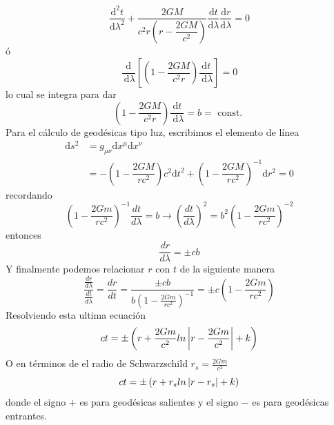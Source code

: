 $$
    \frac{\mathrm{d}^2 t}{\mathrm{d} \lambda^2}+\dfrac{2 G M}{c^2 r\left(r - \dfrac{2 G M}{c^2}\right)} \frac{\mathrm{d} t}{\mathrm{d} \lambda} \frac{\mathrm{d} r}{\mathrm{d} \lambda}=0
$$
ó
$$
    \frac{\mathrm{d}}{\mathrm{~d} \lambda}\left[\left(1-\dfrac{2 G M}{c^2 r}\right) \frac{\mathrm{d} t}{\mathrm{~d} \lambda}\right]=0
$$
lo cual se integra para dar
$$
    \left(1-\dfrac{2 G M}{c^2 r}\right) \frac{\mathrm{d} t}{\mathrm{~d} \lambda}=b=\text { const. }
$$
Para el cálculo de geodésicas tipo luz, escribimos el elemento de línea
\begin{equation}
    \begin{aligned}
        \mathrm{d} s^2 & =g_{\mu \nu} \mathrm{d} x^\mu \mathrm{d} x^\nu                                                                      \\
                       & =-\left(1-\dfrac{2 G M}{r c^2}\right)c^2 \mathrm{d} t^2+\left(1-\dfrac{2 G M}{r c^2}\right)^{-1} \mathrm{d} r^2 = 0
    \end{aligned}
\end{equation}
recordando
\begin{equation}
    \left(1-\frac{2 G m}{r c^2}\right)^{-1} \frac{dt}{d\lambda}  = b \rightarrow  \left(\frac{dt}{d\lambda}\right)^2 = b^2 \left(1-\frac{2 G m}{r c^2}\right)^{-2}
\end{equation}
entonces
\begin{equation}
    \frac{d r }{d \lambda}= \pm cb
\end{equation}
Y finalmente podemos relacionar $r$ con $t$  de la siguiente manera
\begin{equation}
    \frac{\frac{dr}{d\lambda}}{\frac{dt}{d\lambda}} =   \frac{dr}{dt} =  \frac{\pm cb }{ b \left(1-\frac{2 G m}{r c^2}\right)^{-1}} = \pm c \left(1-\frac{2 G m}{r c^2}\right)
\end{equation}
Resolviendo esta ultima ecuación
\begin{equation}
    ct = \pm \left(r + \frac{2 G m}{c^2}ln\left| r -\frac{2 G m}{c^2}  \right| + k \right)
\end{equation}
O en términos de el radio de Schwarzschild $r_s = \frac{2 G m}{c^2}$
\begin{equation}
    ct = \pm \left(r + r_s ln\left| r - r_s \right| + k \right)
\end{equation}
donde el signo $+$ es para geodésicas salientes y el signo $-$ es para geodésicas entrantes.
